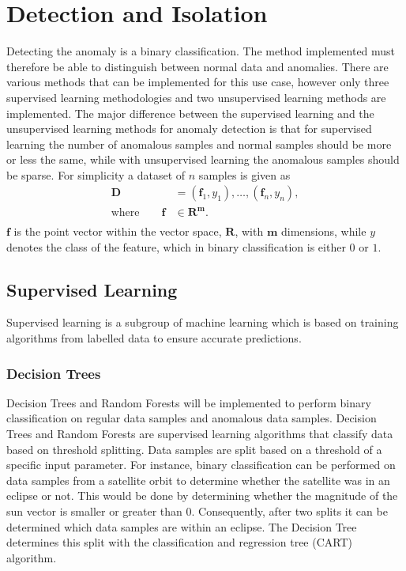\chapter{Detection and Isolation}
\label{chap:Detection}
Detecting the anomaly is a binary classification. The method implemented must therefore be able to distinguish between normal data and anomalies. There are various methods that can be implemented for this use case, however only three supervised learning methodologies and two unsupervised learning methods are implemented. The major difference between the supervised learning and the unsupervised learning methods for anomaly detection is that for supervised learning the number of anomalous samples and normal samples should be more or less the same, while with unsupervised learning the anomalous samples should be sparse. For simplicity a dataset of $n$ samples is given as 
\begin{equation}
\begin{aligned}
\mathbf{D} &= \left(\mathbf{f}_1, y_1 \right), \ldots , \left(\mathbf{f}_n, y_n \right), \\
\text{where} \qquad \mathbf{f} & \in \mathbf{R^m}. \\
\end{aligned}
\end{equation}
$\mathbf{f}$ is the point vector within the vector space, $\mathbf{R}$, with $\mathbf{m}$ dimensions, while $y$ denotes the class of the feature, which in binary classification is either $0$ or $1$.
\section{Supervised Learning}
Supervised learning is a subgroup of machine learning which is based on training algorithms from labelled data to ensure accurate predictions.

\subsection{Decision Trees}
Decision Trees and Random Forests will be implemented to perform binary classification on regular data samples and anomalous data samples. Decision Trees \cite{Reif2008} and Random Forests \cite{Shi2006, Paul2018, Primartha2018} are supervised learning algorithms that classify data based on threshold splitting. Data samples are split based on a threshold of a specific input parameter. For instance, binary classification can be performed on data samples from a satellite orbit to determine whether the satellite was in an eclipse or not. This would be done by determining whether the magnitude of the sun vector is smaller or greater than $0$. Consequently, after two splits it can be determined which data samples are within an eclipse. The Decision Tree determines this split with the classification and regression tree (CART) algorithm.

